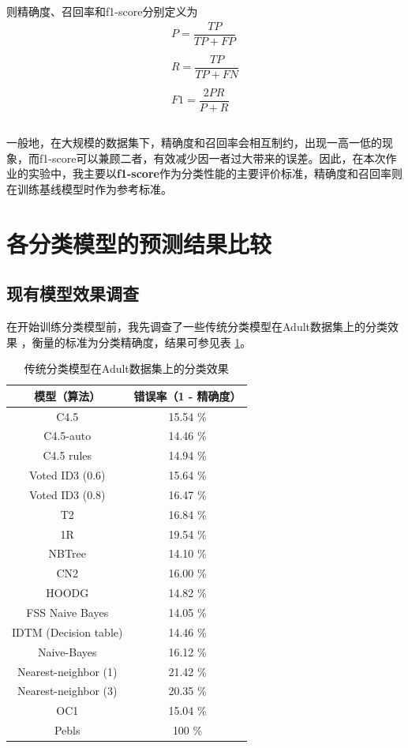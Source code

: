 \documentclass[12pt,a4paper]{article}
\theoremstyle{definition}
\begin{document}
则精确度、召回率和f1-score分别定义为
\begin{equation}
	\begin{aligned}
	P = \dfrac{TP}{TP + FP} \\ \\
	R = \dfrac{TP}{TP + FN} \\ \\
	F1 = \dfrac{2PR}{P + R} \\ \\
	\end{aligned}
\end{equation}

\vspace{-0.03\linewidth}
一般地，在大规模的数据集下，精确度和召回率会相互制约，出现一高一低的现象，而f1-score可以兼顾二者，有效减少因一者过大带来的误差。因此，在本次作业的实验中，我主要以\textbf{f1-score}作为分类性能的主要评价标准，精确度和召回率则在训练基线模型时作为参考标准。

\section{各分类模型的预测结果比较}
\label{sec:model-single}

\subsection{现有模型效果调查}

在开始训练分类模型前，我先调查了一些传统分类模型在Adult数据集上的分类效果 \cite{bench}，衡量的标准为分类精确度，结果可参见表 \ref{tab:bench}。

\begin{table}[H]
	\centering
	\renewcommand\arraystretch{1.35}
	\begin{tabular}{c|c}
		模型（算法） & 错误率（1 - 精确度） \\
		\hline
		\hline
	
		C4.5 & 15.54 \% \\
		C4.5-auto & 14.46 \% \\
		C4.5 rules & 14.94 \% \\
		Voted ID3 (0.6) & 15.64 \% \\
		Voted ID3 (0.8) & 16.47 \% \\
		T2 & 16.84 \% \\
		1R & 19.54 \% \\
		NBTree & 14.10 \% \\
		CN2 & 16.00 \% \\
		HOODG & 14.82 \% \\
		FSS Naive Bayes & 14.05 \% \\
		IDTM (Decision table) & 14.46 \% \\
		Naive-Bayes & 16.12 \% \\
		Nearest-neighbor (1) & 21.42 \% \\
		Nearest-neighbor (3) & 20.35 \% \\
		OC1 & 15.04 \% \\
		Pebls & 100 \% \\
		
	\end{tabular}
	\caption{传统分类模型在Adult数据集上的分类效果}
	\label{tab:bench}
\end{table}
\end{document}
